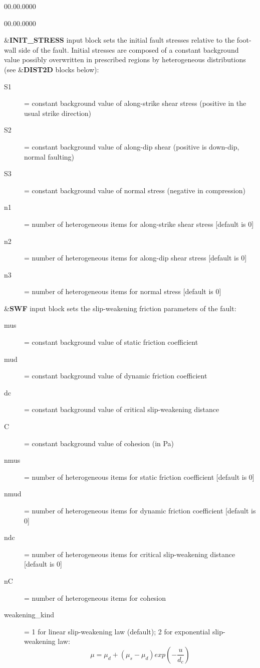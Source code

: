 \begin{lyxlist}{00.00.0000}
\begin{lyxlist}{00.00.0000}
\item [{\&\textbf{INIT\_STRESS}}] input block sets the initial fault stresses
relative to the foot-wall side of the fault. Initial stresses are
composed of a constant background value possibly overwritten in prescribed
regions by heterogeneous distributions (see \&\textbf{DIST2D} blocks
below):
\begin{description}
\item [{S1}] = constant background value of along-strike shear stress (positive
in the usual strike direction)
\item [{S2}] = constant background value of along-dip shear (positive is
down-dip, normal faulting)
\item [{S3}] = constant background value of normal stress (negative in
compression)
\item [{n1}] = number of heterogeneous items for along-strike shear stress
{[}default is 0{]}
\item [{n2}] = number of heterogeneous items for along-dip shear stress
{[}default is 0{]}
\item [{n3}] = number of heterogeneous items for normal stress {[}default
is 0{]}
\end{description}

\item [{\&\textbf{SWF}}] input block sets the slip-weakening friction parameters
of the fault:
\begin{description}
\item [{mus}] = constant background value of static friction coefficient
\item [{mud}] = constant background value of dynamic friction coefficient
\item [{dc}] = constant background value of critical slip-weakening distance
\item [{C}] = constant background value of cohesion (in Pa)
\item [{nmus}] = number of heterogeneous items for static friction coefficient
{[}default is 0{]}
\item [{nmud}] = number of heterogeneous items for dynamic friction coefficient
{[}default is 0{]}
\item [{ndc}] = number of heterogeneous items for critical slip-weakening
distance {[}default is 0{]}
\item [{nC}] = number of heterogeneous items for cohesion
\item [{weakening_kind}] = 1 for linear slip-weakening law (default); 2 for exponential slip-weakening law:
                            $$\mu = \mu_d + (\mu_s-\mu_d) exp(-\frac{u}{d_c}) $$
\end{description}


\end{lyxlist}
\end{lyxlist}
